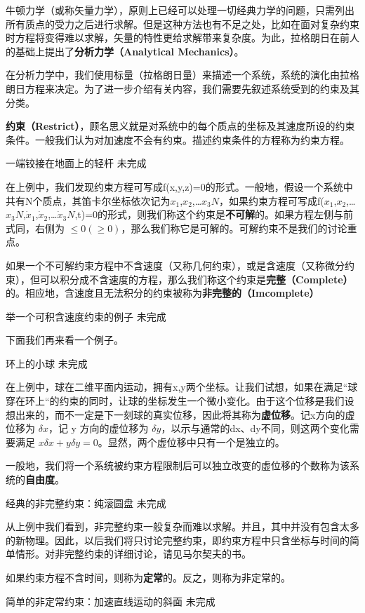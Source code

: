 
\begin{issues}
\issueDraft
\issueTODO
\end{issues}


牛顿力学（或称矢量力学），原则上已经可以处理一切经典力学的问题，只需列出所有质点的受力之后进行求解。但是这种方法也有不足之处，比如在面对复杂约束时方程将变得难以求解，矢量的特性更给求解带来复杂度。为此，拉格朗日在前人的基础上提出了\textbf{分析力学（Analytical Mechanics）}。

在分析力学中，我们使用标量（拉格朗日量）来描述一个系统，系统的演化由拉格朗日方程来决定。为了进一步介绍有关内容，我们需要先叙述系统受到的约束及其分类。

\textbf{约束（Restrict）}，顾名思义就是对系统中的每个质点的坐标及其速度所设的约束条件。一般我们认为对加速度不会有约束。描述约束条件的方程称为约束方程。

\begin{example}{一端铰接在地面上的轻杆}
未完成
\end{example}

在上例中，我们发现约束方程可写成f(x,y,z)=0的形式。一般地，假设一个系统中共有N个质点，其笛卡尔坐标依次记为$x
_1$,$x_2$,…$x_3N$，如果约束方程可写成f($x_1$,$x_2$,…$x_3N$,$\dot x_1$,$\dot x_2$,…$\dot x_3N$,t)=0的形式，则我们称这个约束是\textbf{不可解}的。如果方程左侧与前式同，右侧为 $\leq 0(\geqslant 0)$，那么我们称它是可解的。可解约束不是我们的讨论重点。

如果一个不可解约束方程中不含速度（又称几何约束），或是含速度（又称微分约束），但可以积分成不含速度的方程，那么我们称这个约束是\textbf{完整（Complete）}的。相应地，含速度且无法积分的约束被称为\textbf{非完整的（Imcomplete）}

\begin{example}{举一个可积含速度约束的例子}
未完成
\end{example}

下面我们再来看一个例子。

\begin{example}{环上的小球}
未完成
\end{example}

在上例中，球在二维平面内运动，拥有x,y两个坐标。让我们试想，如果在满足“球穿在环上“的约束的同时，让球的坐标发生一个微小变化。由于这个位移是我们设想出来的，而不一定是下一刻球的真实位移，因此将其称为\textbf{虚位移}。记x方向的虚位移为 $\delta x$，记 y 方向的虚位移为 $\delta y$，以示与通常的dx、dy不同，则这两个变化需要满足 $x\delta x+y\delta y=0$。显然，两个虚位移中只有一个是独立的。

一般地，我们将一个系统被约束方程限制后可以独立改变的虚位移的个数称为该系统的\textbf{自由度}。

\begin{example}{经典的非完整约束：纯滚圆盘}
未完成
\end{example}

从上例中我们看到，非完整约束一般复杂而难以求解。并且，其中并没有包含太多的新物理。因此，以后我们将只讨论完整约束，即约束方程中只含坐标与时间的简单情形。对非完整约束的详细讨论，请见马尔契夫的书。

如果约束方程不含时间，则称为\textbf{定常}的。反之，则称为非定常的。

\begin{example}{简单的非定常约束：加速直线运动的斜面}
未完成
\end{example}
